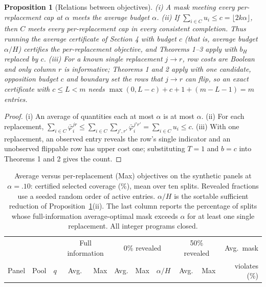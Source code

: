 \documentclass[11pt]{article}
\newtheorem{proposition}{Proposition}
\newcommand{\bH}{b_H}
\begin{document}
\begin{proposition}[Relations between objectives]
\label{prop:relations}
(i) A mask meeting every per-replacement cap at $\alpha$ meets the average budget $\alpha$. (ii) If $\sum_{i\in C}u_i\le c=\lfloor 2k\alpha\rfloor$, then $C$ meets every per-replacement cap in every consistent completion. Thus running the average certificate of Section 4 with budget $c$ (that is, average budget $\alpha/H$) certifies the per-replacement objective, and Theorems 1--3 apply with $\bH$ replaced by $c$. (iii) For a known single replacement $j\to r$, row costs are Boolean and only column $r$ is informative; Theorems 1 and 2 apply with one candidate, opposition budget $c$ and boundary set the rows that $j\to r$ can flip, so an exact certificate with $c\le L<m$ needs $\max(0,L-c)+c+1+(m-L-1)=m$ entries.
\end{proposition}
\begin{proof}
(i) An average of quantities each at most $\alpha$ is at most $\alpha$. (ii) For each replacement, $\sum_{i\in C}\bar\varphi_i^{jr}\le\sum_{i\in C}\sum_{j',r'}\bar\varphi_i^{j'r'}=\sum_{i\in C}u_i\le c$. (iii) With one replacement, an observed entry reveals the row's single indicator and an unobserved flippable row has upper cost one; substituting $T=1$ and $b=c$ into Theorems 1 and 2 gives the count.
\end{proof}

\begin{table}[t]
\centering\small
\setlength{\tabcolsep}{4pt}
\begin{tabular}{@{}lllrrrrrrrr@{}}
\toprule
& & & \multicolumn{2}{c}{Full information} & \multicolumn{3}{c}{0\% revealed} & \multicolumn{2}{c}{50\% revealed} & Avg.\ mask\\
\cmidrule(lr){4-5}\cmidrule(lr){6-8}\cmidrule(lr){9-10}
Panel & Pool & $q$ & Avg. & Max & Avg. & Max & $\alpha/H$ & Avg. & Max & violates (\%)\\
\midrule
\bottomrule
\end{tabular}
\caption{Average versus per-replacement (Max) objectives on the synthetic panels at $\alpha=.10$: certified selected coverage (\%), mean over ten splits. Revealed fractions use a seeded random order of active entries. $\alpha/H$ is the sortable sufficient reduction of Proposition~\ref{prop:relations}(ii). The last column reports the percentage of splits whose full-information average-optimal mask exceeds $\alpha$ for at least one single replacement. All integer programs closed.}
\label{tab:caps}
\end{table}
\end{document}

